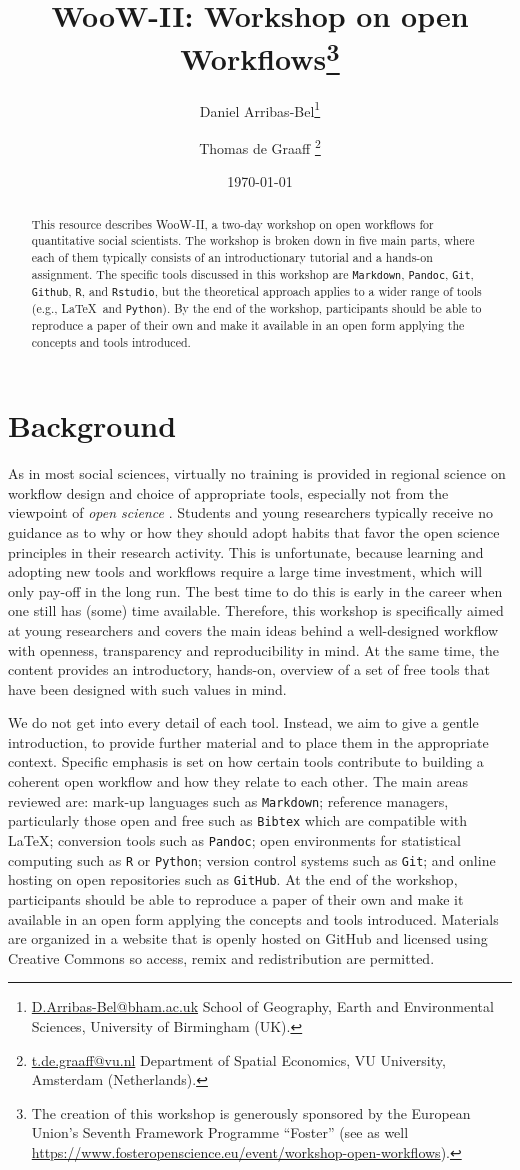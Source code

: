 \documentclass[11pt, a4paper]{article}
\title{WooW-II: Workshop on open Workflows\footnote{The creation of this workshop is generously sponsored by the European
		Union's Seventh Framework Programme ``Foster'' (see as well \url{https://www.fosteropenscience.eu/event/workshop-open-workflows}).
	}}
\author{Daniel
Arribas-Bel\footnote{\href{mailto:D.Arribas-Bel@bham.ac.uk}{D.Arribas-Bel@bham.ac.uk}
School of Geography, Earth and Environmental Sciences, University of
Birmingham (UK).}
\and 
Thomas de Graaff
\footnote{\href{mailto:t.de.graaff@vu.nl}{t.de.graaff@vu.nl}
Department of Spatial Economics, VU University, Amsterdam (Netherlands).}}
\date{\today}
\begin{document}
\maketitle

\begin{abstract}
This resource describes WooW-II, a two-day workshop on open workflows for
quantitative social scientists. The workshop is broken down in five main
parts, where each of them typically consists of an introductionary tutorial and a
hands-on assignment. The specific tools discussed in this workshop are
\texttt{Markdown}, \texttt{Pandoc}, \texttt{Git}, \texttt{Github}, \texttt{R},
and \texttt{Rstudio}, but the theoretical approach applies to a wider range of
tools (e.g., \LaTeX \, and \texttt{Python}). By the end of the workshop,
participants should be able to reproduce a paper of their own and make it
available in an open form applying the concepts and tools introduced.
\end{abstract}

\section{Background}
\label{sec-1}

As in most social sciences, virtually no training is provided in regional
science on workflow design and choice of appropriate tools, especially not
from the viewpoint of \emph{open science} \citep{healy2011choosing,
arribas2014}. Students and young researchers
typically receive no guidance as to why or how they should adopt habits that
favor the open science principles in their research activity. This is
unfortunate, because learning and adopting new tools and workflows require a
large time investment, which will only pay-off in the long run. The best time
to do this is early in the career when one still has (some) time available.
Therefore, this workshop is specifically aimed at young researchers and covers
the main ideas behind a well-designed workflow with openness, transparency and
reproducibility in mind. At the same time, the content provides an
introductory, hands-on, overview of a
set of free tools that have been designed with such values in
mind.

We do not get into every detail of each tool. Instead, we aim to give a gentle
introduction, to provide further material and to place them in the appropriate
context. Specific emphasis is set on how certain tools contribute to
building a coherent open workflow and how they relate to each other. The main
areas reviewed are: mark-up languages such as \texttt{Markdown};
reference managers, particularly those open and free such as \texttt{Bibtex}
which are compatible with \LaTeX; conversion tools such as \texttt{Pandoc};
open environments for statistical computing such as \texttt{R} or
\texttt{Python}; version control systems such as \texttt{Git}; and online
hosting on open repositories such as \texttt{GitHub}. At the end of the
workshop, participants should be able to reproduce a paper of their own and
make it available in an open form applying the concepts and tools introduced.
Materials are organized in a website that is openly hosted on GitHub and
licensed using Creative Commons so access, remix and redistribution are
permitted.
\end{document}
